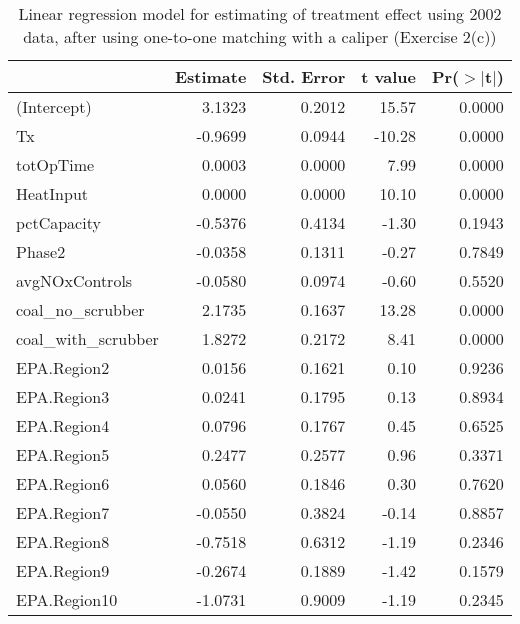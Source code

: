 \begin{table}[ht]
\centering
\begin{tabular}{lrrrr}
  \toprule
 & Estimate & Std. Error & t value & Pr($>$$|$t$|$) \\ 
  \midrule
(Intercept) & 3.1323 & 0.2012 & 15.57 & 0.0000 \\ 
  Tx & -0.9699 & 0.0944 & -10.28 & 0.0000 \\ 
  totOpTime & 0.0003 & 0.0000 & 7.99 & 0.0000 \\ 
  HeatInput & 0.0000 & 0.0000 & 10.10 & 0.0000 \\ 
  pctCapacity & -0.5376 & 0.4134 & -1.30 & 0.1943 \\ 
  Phase2 & -0.0358 & 0.1311 & -0.27 & 0.7849 \\ 
  avgNOxControls & -0.0580 & 0.0974 & -0.60 & 0.5520 \\ 
  coal\_no\_scrubber & 2.1735 & 0.1637 & 13.28 & 0.0000 \\ 
  coal\_with\_scrubber & 1.8272 & 0.2172 & 8.41 & 0.0000 \\ 
  EPA.Region2 & 0.0156 & 0.1621 & 0.10 & 0.9236 \\ 
  EPA.Region3 & 0.0241 & 0.1795 & 0.13 & 0.8934 \\ 
  EPA.Region4 & 0.0796 & 0.1767 & 0.45 & 0.6525 \\ 
  EPA.Region5 & 0.2477 & 0.2577 & 0.96 & 0.3371 \\ 
  EPA.Region6 & 0.0560 & 0.1846 & 0.30 & 0.7620 \\ 
  EPA.Region7 & -0.0550 & 0.3824 & -0.14 & 0.8857 \\ 
  EPA.Region8 & -0.7518 & 0.6312 & -1.19 & 0.2346 \\ 
  EPA.Region9 & -0.2674 & 0.1889 & -1.42 & 0.1579 \\ 
  EPA.Region10 & -1.0731 & 0.9009 & -1.19 & 0.2345 \\ 
   \bottomrule
\end{tabular}
\caption{Linear regression model for estimating of treatment effect
  using 2002 data, after using one-to-one matching with a caliper
  (Exercise 2(c))}
\label{tab:lm-2c-02}
\end{table}

